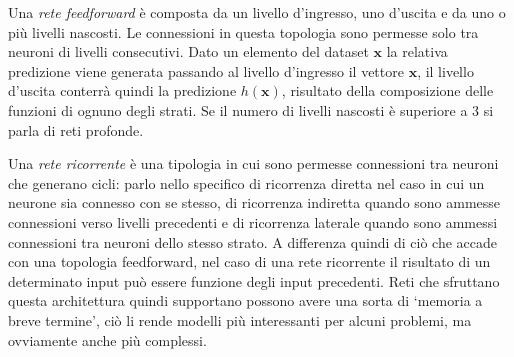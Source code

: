 \documentclass[../../main.tex]{subfiles}
\begin{document}
Una \textit{rete feedforward} è composta da un livello d'ingresso, uno d'uscita e da uno o più livelli nascosti. Le connessioni in questa topologia sono permesse solo tra neuroni di livelli consecutivi. Dato un elemento del dataset $\boldsymbol{x}$ la relativa predizione viene generata passando al livello d'ingresso il vettore $\boldsymbol{x}$, il livello d'uscita conterrà quindi la predizione $h(\boldsymbol{x})$, risultato della composizione delle funzioni di ognuno degli strati. Se il numero di livelli nascosti è superiore a 3 si parla di reti profonde.

Una \textit{rete ricorrente} è una tipologia in cui sono permesse connessioni tra neuroni che generano cicli: parlo nello specifico di ricorrenza diretta nel caso in cui un neurone sia connesso con se stesso, di ricorrenza indiretta quando sono ammesse connessioni verso livelli precedenti e di ricorrenza laterale quando sono ammessi connessioni tra neuroni dello stesso strato. A differenza quindi di ciò che accade con una topologia feedforward, nel caso di una rete ricorrente il risultato di un determinato input può essere funzione degli input precedenti. Reti che sfruttano questa architettura quindi supportano possono avere una sorta di `memoria a breve termine', ciò li rende modelli più interessanti per alcuni problemi, ma ovviamente anche più complessi.
\end{document}
